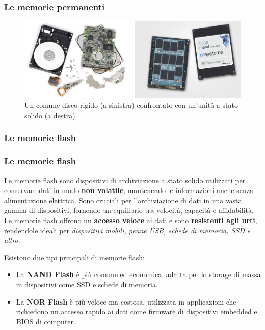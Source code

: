 \begin{frame}
	\frametitle{Le memorie permanenti}
	
	\begin{figure}[!htbp]
		\centering 
		\includegraphics[width=1.0\linewidth]{images/5_memory/hdd_ssd.jpeg}
		\caption{Un comune disco rigido (a sinistra) confrontato con un'unità a stato solido (a destra)}
		\label{fig:memory_hdd_sdd}
	\end{figure}
\end{frame}


\subsubsection[Le memorie flash]{Le memorie flash}
\begin{frame}
	\frametitle{Le memorie flash}
	  
	\begin{block}{}
		Le memorie flash sono dispositivi di archiviazione a stato solido utilizzati per conservare dati in modo \textbf{non volatile}, mantenendo le informazioni anche senza alimentazione elettrica. 
		Sono cruciali per l'archiviazione di dati in una vasta gamma di dispositivi, fornendo un equilibrio tra velocità, capacità e affidabilità.
		Le memorie flash offrono un \textbf{accesso veloce} ai dati e sono \textbf{resistenti agli urti}, rendendole ideali per \textit{dispositivi mobili, penne USB, schede di memoria, SSD e altro}.\\ \vspace{0.5em}

		Esistono due tipi principali di memorie flash:
		\begin{itemize}
			\item La \textbf{NAND Flash} è più comune ed economica, adatta per lo storage di massa in dispositivi come SSD e schede di memoria.
			\item La \textbf{NOR Flash} è più veloce ma costosa, utilizzata in applicazioni che richiedono un accesso rapido ai dati come firmware di dispositivi embedded e BIOS di computer.
		\end{itemize}
		
	\end{block}
	
\end{frame}

